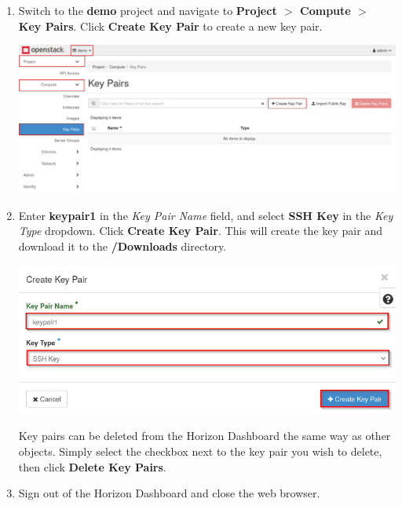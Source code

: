 \documentclass[letterpaper, 12pt]{article}
\begin{document}
\begin{enumerate}
    \item Switch to the \textbf{demo} project and navigate to \textbf{Project $>$ Compute $>$ Key Pairs}.
    Click \textbf{Create Key Pair} to create a new key pair.

    \begin{center}
        \includegraphics[width=\linewidth]{images/part4/step2.png}
    \end{center}

    \item Enter \textbf{keypair1} in the \textit{Key Pair Name} field, and select \textbf{SSH Key} in the \textit{Key Type} dropdown.
    Click \textbf{Create Key Pair}.
    This will create the key pair and download it to the \textbf{\texttildemid/Downloads} directory.

    \begin{center}
        \includegraphics[width=\linewidth]{images/part4/step3.png}
    \end{center}

    \begin{tipbox}
        Key pairs can be deleted from the Horizon Dashboard the same way as other objects.
        Simply select the checkbox next to the key pair you wish to delete, then click \textbf{Delete Key Pairs}.
    \end{tipbox}

    \item Sign out of the Horizon Dashboard and close the web browser.


\end{enumerate}
\end{document}
